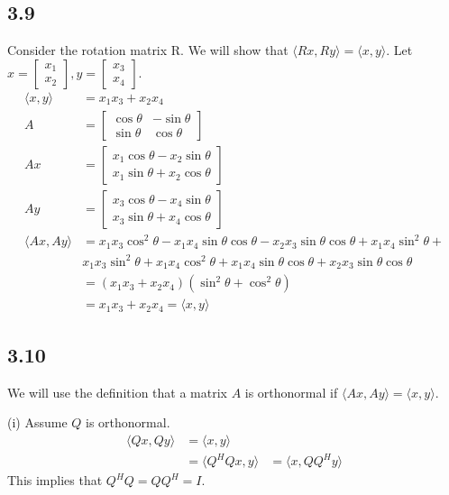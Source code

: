 \documentclass{article}
\newcommand{\inprod}[1]{\langle #1 \rangle}
\begin{document}
	\subsection*{3.9}
	Consider the rotation matrix R. We will show that $\inprod{Rx, Ry} = \inprod{x,y}$. Let $x = \begin{bmatrix} x_1 \\ x_2 \end{bmatrix}, y = \begin{bmatrix} x_3 \\ x_4 \end{bmatrix}$.
	\begin{align*}
	\inprod{x,y} &= x_1 x_3 + x_2 x_4 \\
	A &= \begin{bmatrix} \cos \theta & - \sin \theta \\ \sin \theta & \cos \theta \end{bmatrix} \\
	Ax &= \begin{bmatrix} x_1 \cos \theta - x_2 \sin \theta \\ x_1 \sin \theta + x_2 \cos \theta \end{bmatrix} \\
	Ay &= \begin{bmatrix} x_3 \cos \theta - x_4 \sin \theta \\ x_3 \sin \theta + x_4 \cos \theta \end{bmatrix}\\
	\inprod{Ax, Ay} &= x_1 x_3 \cos^2 \theta - x_1 x_4 \sin\theta \cos\theta - x_2 x_3 \sin\theta \cos\theta + x_1 x_4 \sin^2 \theta + \\
	&x_1 x_3 \sin^2 \theta + x_1 x_4 \cos^2 \theta + x_1 x_4 \sin\theta \cos \theta + x_2 x_3 \sin\theta \cos\theta \\
	&= (x_1 x_3 + x_2 x_4)(\sin^2 \theta + \cos^2 \theta) \\
	&= x_1 x_3 + x_2 x_4 = \inprod{x,y}
	\end{align*}
	
	\subsection*{3.10}
	We will use the definition that a matrix $A$ is orthonormal if $\inprod{Ax, Ay} = \inprod{x,y}$.
	
	(i) Assume $Q$ is orthonormal.
	\begin{align*}
	\inprod{Qx, Qy} &= \inprod{x,y} \\
	&= \inprod{Q^H Q x, y} 
	&= \inprod{x, Q Q^H y}
	\end{align*}
	This implies that $Q^HQ = QQ^H = I$. 
	
\end{document}
